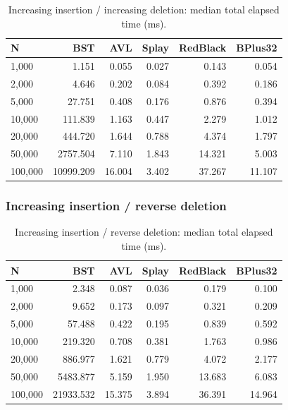 \begin{table}[H]
\centering
\small
\caption{Increasing insertion / increasing deletion: median total elapsed time (ms).}
\begin{tabular}{lrrrrr}
\toprule
N & BST & AVL & Splay & RedBlack & BPlus32 \\
\midrule
1,000 & 1.151 & 0.055 & 0.027 & 0.143 & 0.054 \\
2,000 & 4.646 & 0.202 & 0.084 & 0.392 & 0.186 \\
5,000 & 27.751 & 0.408 & 0.176 & 0.876 & 0.394 \\
10,000 & 111.839 & 1.163 & 0.447 & 2.279 & 1.012 \\
20,000 & 444.720 & 1.644 & 0.788 & 4.374 & 1.797 \\
50,000 & 2757.504 & 7.110 & 1.843 & 14.321 & 5.003 \\
100,000 & 10999.209 & 16.004 & 3.402 & 37.267 & 11.107 \\
\bottomrule
\end{tabular}
\end{table}
\FloatBarrier

\subsubsection{Increasing insertion / reverse deletion}

\begin{table}[H]
\centering
\small
\caption{Increasing insertion / reverse deletion: median total elapsed time (ms).}
\begin{tabular}{lrrrrr}
\toprule
N & BST & AVL & Splay & RedBlack & BPlus32 \\
\midrule
1,000 & 2.348 & 0.087 & 0.036 & 0.179 & 0.100 \\
2,000 & 9.652 & 0.173 & 0.097 & 0.321 & 0.209 \\
5,000 & 57.488 & 0.422 & 0.195 & 0.839 & 0.592 \\
10,000 & 219.320 & 0.708 & 0.381 & 1.763 & 0.986 \\
20,000 & 886.977 & 1.621 & 0.779 & 4.072 & 2.177 \\
50,000 & 5483.877 & 5.159 & 1.950 & 13.683 & 6.083 \\
100,000 & 21933.532 & 15.375 & 3.894 & 36.391 & 14.964 \\
\bottomrule
\end{tabular}
\end{table}
\FloatBarrier

